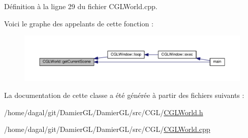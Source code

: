Définition à la ligne 29 du fichier C\-G\-L\-World.\-cpp.



Voici le graphe des appelants de cette fonction \-:\nopagebreak
\begin{figure}[H]
\begin{center}
\leavevmode
\includegraphics[width=350pt]{db/da4/class_c_g_l_world_a266821b98f90eae32b670ff4def8b948_icgraph}
\end{center}
\end{figure}




La documentation de cette classe a été générée à partir des fichiers suivants \-:\begin{DoxyCompactItemize}
\item 
/home/dagal/git/\-Damier\-G\-L/\-Damier\-G\-L/src/\-C\-G\-L/\hyperlink{_c_g_l_world_8h}{C\-G\-L\-World.\-h}\item 
/home/dagal/git/\-Damier\-G\-L/\-Damier\-G\-L/src/\-C\-G\-L/\hyperlink{_c_g_l_world_8cpp}{C\-G\-L\-World.\-cpp}\end{DoxyCompactItemize}
